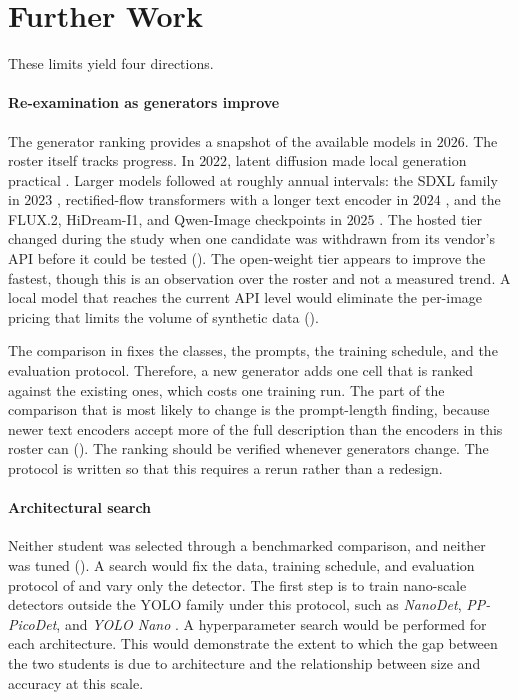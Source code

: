 \section{Further Work}\label{sec:further_work}

These limits yield four directions.

\paragraph{Re-examination as generators improve}
The generator ranking provides a snapshot of the available models in $2026$. The roster itself tracks progress. In $2022$, latent diffusion made local generation practical \cite{rombachHighResolutionImageSynthesis2022}. Larger models followed at roughly annual intervals: the SDXL family in $2023$ \cite{podellSDXLImprovingLatent2023}, rectified-flow transformers with a longer text encoder in $2024$ \cite{esserScalingRectifiedFlow2024}, and the FLUX.2, HiDream-I1, and Qwen-Image checkpoints in $2025$ \cite{labsBlackForestLabs,HiDreamaiHiDreamI1FullHugging2025,QwenQwenImageHugging2025}. The hosted tier changed during the study when one candidate was withdrawn from its vendor's API before it could be tested (). The open-weight tier appears to improve the fastest, though this is an observation over the roster and not a measured trend. A local model that reaches the current API level would eliminate the per-image pricing that limits the volume of synthetic data ().

The comparison in  fixes the classes, the prompts, the training schedule, and the evaluation protocol. Therefore, a new generator adds one cell that is ranked against the existing ones, which costs one training run. The part of the comparison that is most likely to change is the prompt-length finding, because newer text encoders accept more of the full description than the encoders in this roster can (). The ranking should be verified whenever generators change. The protocol is written so that this requires a rerun rather than a redesign.

\paragraph{Architectural search}
Neither student was selected through a benchmarked comparison, and neither was tuned (). A search would fix the data, training schedule, and evaluation protocol of  and vary only the detector. The first step is to train nano-scale detectors outside the YOLO family under this protocol, such as \textit{NanoDet}, \textit{PP-PicoDet}, and \textit{YOLO Nano} \cite{rangilyuRangiLyuNanodet2026,yuPPPicoDetBetterRealTime2021,wongYOLONanoHighly2019}. A hyperparameter search would be performed for each architecture. This would demonstrate the extent to which the gap between the two students is due to architecture and the relationship between size and accuracy at this scale.

